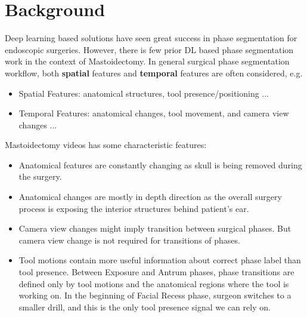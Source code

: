 \documentclass[11pt]{article} \usepackage[top=1in, bottom=1in, left=1in, right=1in]{geometry}
\begin{document}
\section{Background}
Deep learning based solutions have seen great success in phase segmentation for endoscopic surgeries. However, there is few prior DL based phase segmentation work in the context of Mastoidectomy\cite{segmentaion}. In general surgical phase segmentation workflow, both \textbf{spatial} features and \textbf{temporal} features are often considered, e.g.
\begin{itemize}
  \item Spatial Features: anatomical structures, tool presence/positioning ...
  \item Temporal Features: anatomical changes, tool movement, and camera view changes ...
\end{itemize}
Mastoidectomy videos has some characteristic features:
\begin{itemize}
  \item Anatomical features are constantly changing as skull is being removed during the surgery.
  \item Anatomical changes are mostly in depth direction as the overall surgery process is exposing the interior structures behind patient's ear.
  \item Camera view changes might imply transition between surgical phases. But camera view change is not required for transitions of phases.
  \item Tool motions contain more useful information about correct phase label than tool presence. Between Exposure and Antrum phases, phase transitions are defined only by tool motions and the anatomical regions where the tool is working on. In the beginning of Facial Recess phase, surgeon switches to a smaller drill, and this is the only tool presence signal we can rely on.  
\end{itemize}
\end{document}
